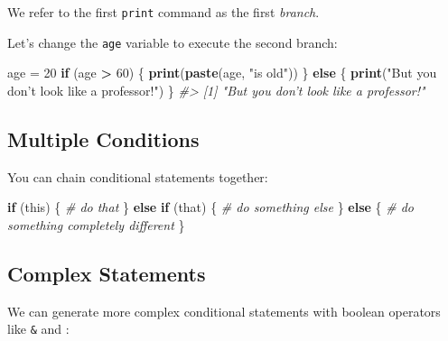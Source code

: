 \documentclass[]{book}
\newenvironment{Shaded}{\begin{snugshade}}{\end{snugshade}}
\newcommand{\CommentTok}[1]{\textcolor[rgb]{0.56,0.35,0.01}{\textit{#1}}}
\newcommand{\ControlFlowTok}[1]{\textcolor[rgb]{0.13,0.29,0.53}{\textbf{#1}}}
\newcommand{\DecValTok}[1]{\textcolor[rgb]{0.00,0.00,0.81}{#1}}
\newcommand{\KeywordTok}[1]{\textcolor[rgb]{0.13,0.29,0.53}{\textbf{#1}}}
\newcommand{\NormalTok}[1]{#1}
\newcommand{\OperatorTok}[1]{\textcolor[rgb]{0.81,0.36,0.00}{\textbf{#1}}}
\newcommand{\StringTok}[1]{\textcolor[rgb]{0.31,0.60,0.02}{#1}}
\begin{document}
We refer to the first \texttt{print} command as the first \emph{branch}.

Let's change the \texttt{age} variable to execute the second branch:

\begin{Shaded}
\begin{Highlighting}[]
\NormalTok{age =}\StringTok{ }\DecValTok{20}
\ControlFlowTok{if}\NormalTok{ (age }\OperatorTok{>}\StringTok{ }\DecValTok{60}\NormalTok{) \{}
    \KeywordTok{print}\NormalTok{(}\KeywordTok{paste}\NormalTok{(age, }\StringTok{"is old"}\NormalTok{))}
\NormalTok{\} }\ControlFlowTok{else}\NormalTok{ \{}
    \KeywordTok{print}\NormalTok{(}\StringTok{"But you don't look like a professor!"}\NormalTok{)}
\NormalTok{\}}
\CommentTok{#> [1] "But you don't look like a professor!"}
\end{Highlighting}
\end{Shaded}

\hypertarget{multiple-conditions}{%
\subsection{Multiple Conditions}\label{multiple-conditions}}

You can chain conditional statements together:

\begin{Shaded}
\begin{Highlighting}[]
\ControlFlowTok{if}\NormalTok{ (this) \{}
  \CommentTok{# do that}
\NormalTok{\} }\ControlFlowTok{else} \ControlFlowTok{if}\NormalTok{ (that) \{}
  \CommentTok{# do something else}
\NormalTok{\} }\ControlFlowTok{else}\NormalTok{ \{}
  \CommentTok{# do something completely different}
\NormalTok{\}}
\end{Highlighting}
\end{Shaded}

\hypertarget{complex-statements}{%
\subsection{Complex Statements}\label{complex-statements}}

We can generate more complex conditional statements with boolean operators like \texttt{\&} and \texttt{\textbar{}}:
\end{document}
